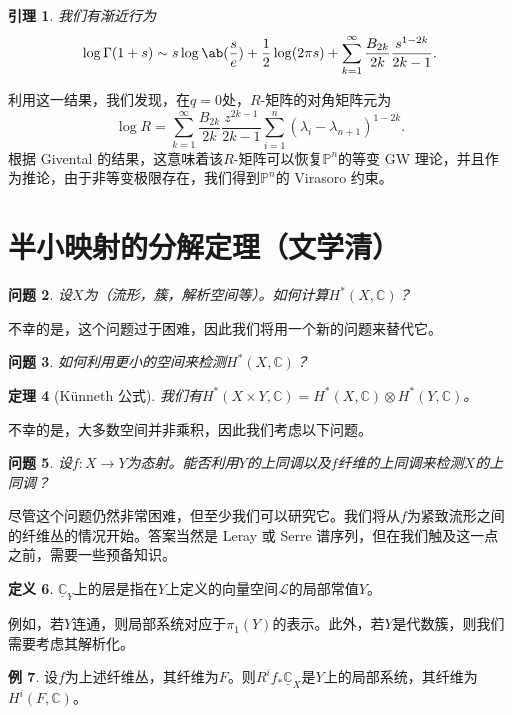 \documentclass{amsart}
\newtheorem{thm}{定理}[section]
\newtheorem{lem}[thm]{引理}
\newtheorem{quest}[thm]{问题}
\theoremstyle{definition}
\newtheorem{defn}[thm]{定义}
\newtheorem{exm}[thm]{例}
\theoremstyle{remark}
\theoremstyle{plain}
\theoremstyle{definition}
\theoremstyle{remark}
\newcommand{\C}{\mathbb{C}}
\renewcommand{\P}{\mathbb{P}}
\newcommand{\mc}[1]{\mathcal{#1}}
\newcommand{\ul}[1]{\underline{#1}}
\newcommand{\1}{\mathbf{1}}
\newcommand{\2}{\mathbf{2}}
\newcommand{\3}{\mathbf{3}}
\begin{document}
\begin{lem}
我们有渐近行为
    \[ \log \Gamma(1+s) \sim s \log \ab(\frac{s}{e}) + \frac{1}{2} \log(2\pi s) + \sum_{k=1}^{\infty} \frac{B_{2k}}{2k} \frac{s^{1-2k}}{2k-1}. \]
\end{lem}
利用这一结果，我们发现，在\(q = 0\)处，\(R\)-矩阵的对角矩阵元为
\[ \log R = \sum_{k=1}^{\infty} \frac{B_{2k}}{2k} \frac{z^{2k-1}}{2k-1} \sum_{i =1}^n (\lambda_i - \lambda_{n+1})^{1-2k}. \]
根据 Givental 的结果，这意味着该\(R\)-矩阵可以恢复\(\P^n\)的等变 GW 理论，并且作为推论，由于非等变极限存在，我们得到\(\P^n\)的 Virasoro 约束。

\section{半小映射的分解定理（文学清）}%
\label{sec:Decomposition theorem for semi-small maps (文学清)}

\begin{quest}
设\(X\)为（流形，簇，解析空间等）。如何计算\(H^*(X, \C)\)？
\end{quest}

不幸的是，这个问题过于困难，因此我们将用一个新的问题来替代它。

\begin{quest}
如何利用更小的空间来检测\(H^*(X, \C)\)？
\end{quest}

\begin{thm}[K\"unneth 公式]
我们有\(H^*(X \times Y, \C) = H^*(X, \C) \otimes H^*(Y, \C)\)。
\end{thm}

不幸的是，大多数空间并非乘积，因此我们考虑以下问题。

\begin{quest}
设\(f \colon X \to Y\)为态射。能否利用\(Y\)的上同调以及\(f\)纤维的上同调来检测\(X\)的上同调？
\end{quest}

尽管这个问题仍然非常困难，但至少我们可以研究它。我们将从\(f\)为紧致流形之间的纤维丛的情况开始。答案当然是 Leray 或 Serre 谱序列，但在我们触及这一点之前，需要一些预备知识。

\begin{defn}
\(\ul{\C}_Y\)上的层是指在\(Y\)上定义的向量空间\(\mc{L}\)的局部常值\(Y\)。
\end{defn}

例如，若\(Y\)连通，则局部系统对应于\(\pi_1(Y)\)的表示。此外，若\(Y\)是代数簇，则我们需要考虑其解析化。

\begin{exm}
设\(f\)为上述纤维丛，其纤维为\(F\)。则\(R^i f_* \ul{\C}_X\)是\(Y\)上的局部系统，其纤维为\(H^i(F, \C)\)。
\end{exm}
\end{document}
